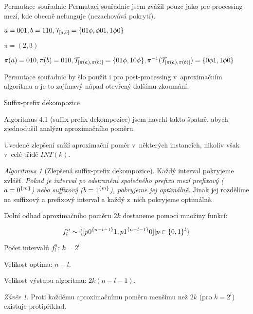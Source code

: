 \documentclass{beamer}
\theoremstyle{remark}
\newtheorem{algorithm}{Algoritmus}
\newtheorem{conclusion}{Závěr}
\begin{document}
\begin{frame}[noframenumbering]{Permutace souřadnic}
Permutaci souřadnic jsem zvážil pouze jako pre-processing mezí, kde obecně nefunguje (nezachovává pokrytí).

\begin{example}
$a = 001, b = 110, \mathcal{T}_{[a, b]} = \{01 \phi, \phi 01, 1 \phi 0\}$

$\pi = (2,3)$

$\pi(a) = 010, \pi(b) = 010,
\mathcal{T}_{[\pi(a), \pi(b)]} = \{01 \phi, 10 \phi\},
\pi^{-1}(\mathcal{T}_{[\pi(a), \pi(b)]}) = \{0 \phi 1, 1 \phi 0\}$
\end{example}

Permutace souřadnic by šlo použít i pro post-processing v~aproximačním algoritmu a je to zajímavý nápad otevřený dalšímu zkoumání.

\end{frame}

\begin{frame}[noframenumbering]{Suffix-prefix dekompozice}

Algoritmus 4.1 (suffix-prefix dekompozice) jsem navrhl takto špatně, abych zjednodušil analýzu aproximačního poměru.

Uvedené zlepšení sníží aproximační poměr v~některých instancích, nikoliv však v~celé třídě $INT(k)$.

\begin{algorithm}[Zlepšená suffix-prefix dekompozice]
Každý interval pokryjeme zvlášť.
\emph{Pokud je interval po odstranění společného prefixu mezí prefixový ($a = 0^{\{m\}}$) nebo suffixový ($b = 1^{\{m\}}$), pokryjeme jej optimálně.}
Jinak jej rozdělíme na suffixový a prefixový interval a každý z~nich pokryjeme optimálně.
\end{algorithm}


Dolní odhad aproximačního poměru $2k$ dostaneme pomocí množiny  funkcí:

$$
f_l^n \sim \{[p 0^{\{n-l-1\}} 1, p 1^{\{n-l-1\}} 0] | p \in \{0, 1\}^l\}
$$

Počet intervalů $f_l^n$: $k = 2^l$

Velikost optima: $n-l$.

Velikost výstupu algoritmu: $2k (n-l-1)$.

\begin{conclusion}
Proti každému aproximačnímu poměru menšímu než $2k$ (pro $k = 2^l$) existuje protipříklad.
\end{conclusion}
\end{frame}
\end{document}
